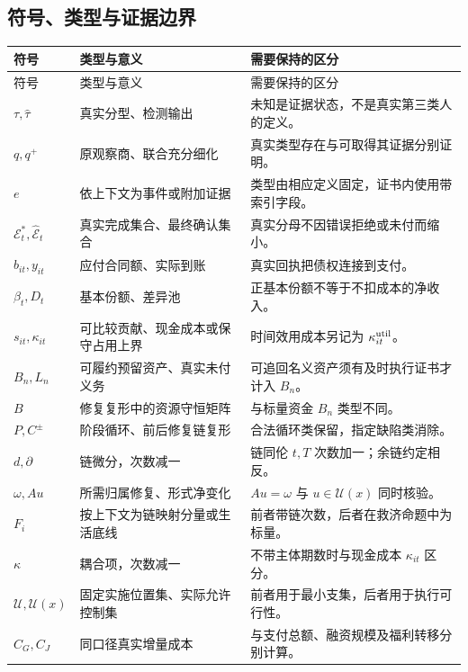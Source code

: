 \documentclass[12pt,a4paper,openany]{report}
\begin{document}
\begin{CJK*}{UTF8}{gkai}
\chapter{符号、类型与证据边界}
\label{app:notation}
\begingroup
\small
\renewcommand{\arraystretch}{1.2}
\begin{longtable}{P{3.1cm}P{5.1cm}P{6.4cm}}
\toprule
符号 & 类型与意义 & 需要保持的区分\\
\midrule
\endfirsthead
\toprule
符号 & 类型与意义 & 需要保持的区分\\
\midrule
\endhead
\bottomrule
\endfoot
\(\tau,\widehat\tau\) & 真实分型、检测输出 & 未知是证据状态，不是真实第三类人的定义。\\
\(q,q^+\) & 原观察商、联合充分细化 & 真实类型存在与可取得其证据分别证明。\\
\(e\) & 依上下文为事件或附加证据 & 类型由相应定义固定，证书内使用带索引字段。\\
\(\mathcal E_t^*,\widehat{\mathcal E}_t\) & 真实完成集合、最终确认集合 & 真实分母不因错误拒绝或未付而缩小。\\
\(b_{it},y_{it}\) & 应付合同额、实际到账 & 真实回执把债权连接到支付。\\
\(\beta_t,D_t\) & 基本份额、差异池 & 正基本份额不等于不扣成本的净收入。\\
\(s_{it},\kappa_{it}\) & 可比较贡献、现金成本或保守占用上界 & 时间效用成本另记为 \(\kappa_{it}^{\rm util}\)。\\
\(B_n,L_n\) & 可履约预留资产、真实未付义务 & 可追回名义资产须有及时执行证书才计入 \(B_n\)。\\
\(B\) & 修复复形中的资源守恒矩阵 & 与标量资金 \(B_n\) 类型不同。\\
\(P,C^\pm\) & 阶段循环、前后修复链复形 & 合法循环类保留，指定缺陷类消除。\\
\(d,\partial\) & 链微分，次数减一 & 链同伦 \(t,T\) 次数加一；余链约定相反。\\
\(\omega,A u\) & 所需归属修复、形式净变化 & \(Au=\omega\) 与 \(u\in\mathcal U(x)\) 同时核验。\\
\(F_i\) & 按上下文为链映射分量或生活底线 & 前者带链次数，后者在救济命题中为标量。\\
\(\kappa\) & 耦合项，次数减一 & 不带主体期数时与现金成本 \(\kappa_{it}\) 区分。\\
\(\mathcal U,\mathcal U(x)\) & 固定实施位置集、实际允许控制集 & 前者用于最小支集，后者用于执行可行性。\\
\(C_G,C_J\) & 同口径真实增量成本 & 与支付总额、融资规模及福利转移分别计算。\\
\end{longtable}
\endgroup


\end{CJK*}
\end{document}
